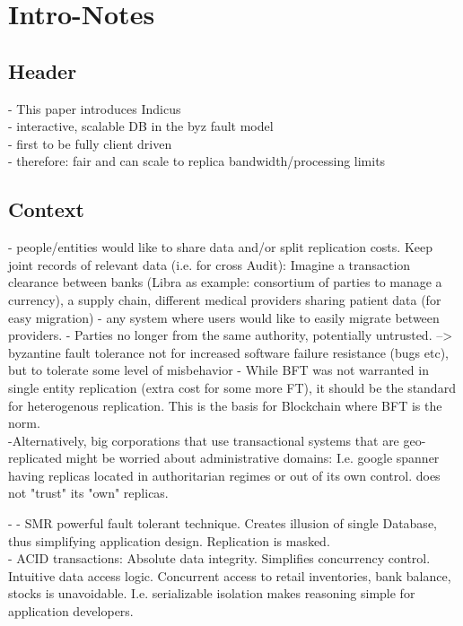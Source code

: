 \section{Intro-Notes}

\subsection{Header}

 - This paper introduces Indicus\\
 - interactive, scalable DB in the byz fault model\\
 - first to be fully client driven\\
 - therefore: fair and can scale to replica bandwidth/processing limits
 
 \subsection{Context}
 - people/entities would like to share data and/or split replication costs. Keep joint records of relevant data (i.e. for cross Audit): Imagine a transaction clearance between banks  (Libra as example: consortium of parties to manage a currency), a supply chain, different medical providers sharing patient data (for easy migration) - any system where users would like to easily migrate between providers.
 - Parties no longer from the same authority, potentially untrusted. --> byzantine fault tolerance not for increased software failure resistance (bugs etc), but to tolerate some level of misbehavior
 - While BFT was not warranted in single entity replication (extra cost for some more FT), it should be the standard for heterogenous replication. This is the basis for Blockchain where BFT is the norm.\\
 
 -Alternatively, big corporations that use transactional systems that are geo-replicated might be worried about administrative domains: I.e. google spanner having replicas located in authoritarian regimes or out of its own control. does not "trust" its "own" replicas.
 
 -
 - SMR powerful fault tolerant technique. Creates illusion of single Database, thus simplifying application design. Replication is masked.\\
 
- ACID transactions: Absolute data integrity. Simplifies concurrency control. Intuitive data access logic.
Concurrent access to retail inventories,  bank balance, stocks is unavoidable. I.e. serializable isolation makes reasoning simple for application developers.

